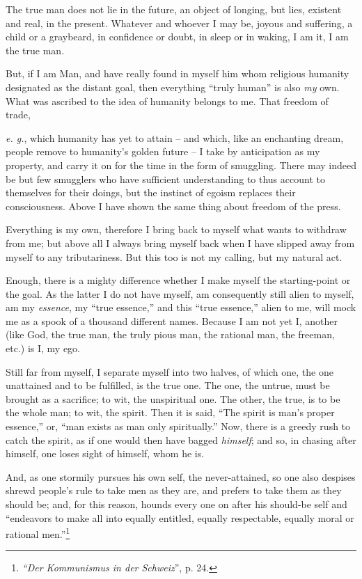 \documentclass[12pt,a4paper]{book}
\begin{document}
The true man does not lie in the future, an object of longing, but lies, 
existent and real, in the present. Whatever and whoever I may be, joyous and 
suffering, a child or a graybeard, in confidence or doubt, in sleep or in 
waking, I am it, I am the true man.

But, if I am Man, and have really found in myself him whom religious humanity 
designated as the distant goal, then everything ``truly human'' is also 
\textit{my} own. What was ascribed to the idea of humanity belongs to me. That 
freedom of trade,

\textit{e. g.}, which humanity has yet to attain -- and which, like an 
enchanting dream, people remove to humanity's golden future -- I take by 
anticipation as my property, and carry it on for the time in the form of 
smuggling. There may indeed be but few smugglers who have sufficient 
understanding to thus account to themselves for their doings, but the instinct 
of egoism replaces their consciousness. Above I have shown the same thing 
about freedom of the press.

Everything is my own, therefore I bring back to myself what wants to withdraw 
from me; but above all I always bring myself back when I have slipped away 
from myself to any tributariness. But this too is not my calling, but my 
natural act.

Enough, there is a mighty difference whether I make myself the starting-point 
or the goal. As the latter I do not have myself, am consequently still alien 
to myself, am my \textit{essence}, my ``true essence,'' and this ``true 
essence,'' alien to me, will mock me as a spook of a thousand different 
names. Because I am not yet I, another (like God, the true man, the truly 
pious man, the rational man, the freeman, etc.) is I, my ego.

Still far from myself, I separate myself into two halves, of which one, the 
one unattained and to be fulfilled, is the true one. The one, the untrue, must 
be brought as a sacrifice; to wit, the unspiritual one. The other, the true, 
is to be the whole man; to wit, the spirit. Then it is said, ``The spirit is 
man's proper essence,'' or, ``man exists as man only spiritually.'' Now, 
there is a greedy rush to catch the spirit, as if one would then have bagged 
\textit{himself}; and so, in chasing after himself, one loses sight of 
himself, whom he is.

And, as one stormily pursues his own self, the never-attained, so one also 
despises shrewd people's rule to take men as they are, and prefers to take 
them as they should be; and, for this reason, hounds every one on after his 
should-be self and ``endeavors to make all into equally entitled, equally 
respectable, equally moral or rational men.''\footnote{\textit{``Der 
Kommunismus in der Schweiz}'', p. 24.}
\end{document}
